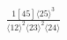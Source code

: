 \documentclass[varwidth, border=5pt]{standalone}
\begin{document}
\begin{my}
$\begin{gathered}
\scriptscriptstyle\frac{1[45]⟨25⟩^3}{⟨12⟩^2⟨23⟩^2⟨24⟩}
\end{gathered}$
\end{my}
\end{document}
